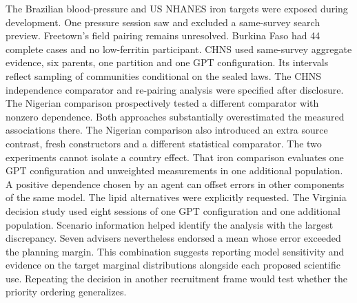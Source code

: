\documentclass[sigconf,anonymous,review]{acmart}
\begin{document}
The Brazilian blood-pressure and US NHANES iron targets were exposed during development. One pressure session saw and excluded a same-survey search preview. Freetown's field pairing remains unresolved. Burkina Faso had 44 complete cases and no low-ferritin participant. CHNS used same-survey aggregate evidence, six parents, one partition and one GPT configuration. Its intervals reflect sampling of communities conditional on the sealed laws. The CHNS independence comparator and re-pairing analysis were specified after disclosure. The Nigerian comparison prospectively tested a different comparator with nonzero dependence. Both approaches substantially overestimated the measured associations there. The Nigerian comparison also introduced an extra source contrast, fresh constructors and a different statistical comparator. The two experiments cannot isolate a country effect. That iron comparison evaluates one GPT configuration and unweighted measurements in one additional population. A positive dependence chosen by an agent can offset errors in other components of the same model. The lipid alternatives were explicitly requested. The Virginia decision study used eight sessions of one GPT configuration and one additional population. Scenario information helped identify the analysis with the largest discrepancy. Seven advisers nevertheless endorsed a mean whose error exceeded the planning margin. This combination suggests reporting model sensitivity and evidence on the target marginal distributions alongside each proposed scientific use. Repeating the decision in another recruitment frame would test whether the priority ordering generalizes.



\appendix

\end{document}
